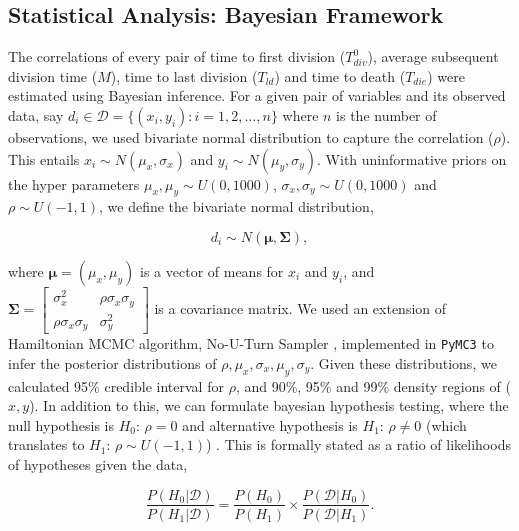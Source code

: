 \documentclass[11pt, a4paper]{article}
\begin{document}
\subsection{Statistical Analysis: Bayesian Framework}
\linenumbers
The correlations of every pair of time to first division ($T_{div}^0$), average subsequent division time ($M$), time to last division ($T_{ld}$) and time to death ($T_{die}$) were estimated using Bayesian inference. For a given pair of variables and its observed data, say $d_i \in \mathcal{D} = \{(x_i, y_i) : i=1,2,\dots,n\}$ where $n$ is the number of observations, we used bivariate normal distribution to capture the correlation ($\rho$). This entails $x_i \sim N(\mu_x, \sigma_x)$ and $y_i \sim N(\mu_y, \sigma_y)$. With uninformative priors on the hyper parameters $\mu_x, \mu_y \sim U(0, 1000)$, $\sigma_x, \sigma_y \sim U(0, 1000)$ and $\rho \sim U(-1, 1)$, we define the bivariate normal distribution,
\begin{linenomath*}
    \begin{equation*}
        d_i \sim N(\boldsymbol{\mu}, \mathbf{\Sigma}),
    \end{equation*}
\end{linenomath*}
where $\boldsymbol{\mu} = (\mu_x, \mu_y)$ is a vector of means for $x_i$ and $y_i$, and $\mathbf{\Sigma} = \begin{bmatrix*} \sigma_x^2 & \rho \sigma_x \sigma_y \\ \rho \sigma_x \sigma_y & \sigma_y^2 \end{bmatrix*}$ is a covariance matrix. We used an extension of Hamiltonian MCMC algorithm, No-U-Turn Sampler \parencite{Hoffman.2011}, implemented in \verb+PyMC3+ \parencite{Salvatier.2016} to infer the posterior distributions of $\rho, \mu_x, \sigma_x, \mu_y, \sigma_y$. Given these distributions, we calculated 95\% credible interval for $\rho$, and 90\%, 95\% and 99\% density regions of ($x, y$). In addition to this, we can formulate bayesian hypothesis testing, where the null hypothesis is $H_0$: $\rho=0$ and alternative hypothesis is $H_1$: $\rho \neq 0$ (which translates to $H_1$: $\rho \sim U(-1, 1)$) \parencite{Jeffreys.1961}. This is formally stated as a ratio of likelihoods of hypotheses given the data,
\begin{linenomath*}
    \begin{equation*}
        \frac{P(H_0 | \mathcal{D})}{P(H_1 | \mathcal{D})} = \frac{P(H_0)}{P(H_1)} \times \frac{P(\mathcal{D} | H_0)}{P(\mathcal{D} | H_1)}.
    \end{equation*}
\end{linenomath*}
\end{document}
